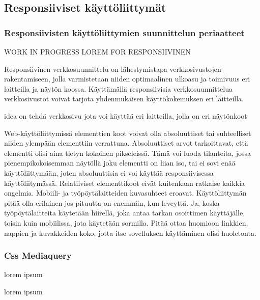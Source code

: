 \documentclass[11pt,a4paper,titlepage,oneside]{article}
\begin{document}
\newpage
\subsection{Responsiiviset käyttöliittymät}

\subsubsection{Responsiivisten käyttöliittymien suunnittelun periaatteet}

WORK IN PROGRESS LOREM FOR RESPONSIIVINEN
\medskip


Responsiivinen verkkosuunnittelu on lähestymistapa verkkosivustojen rakentamiseen, jolla varmistetaan niiden optimaalinen ulkoasu ja toimivuus eri laitteilla ja näytön koossa.
Käyttämällä responsiivisia verkkosuunnittelua verkkosivustot voivat tarjota yhdenmukaisen käyttökokemuksen eri laitteilla.

idea on tehdä verkkosivu jota voi käyttää eri laitteilla, jolla on eri näytönkoot
\medskip


Web-käyttöliittymissä elementtien koot voivat olla absoluuttiset tai suhteelliset niiden ylempään elementtiin verrattuna. Absoluuttiset arvot tarkoittavat, että elementti olisi aina tietyn kokoinen pikseleissä. 
Tämä voi luoda tilanteita, jossa pienempikokoisemman näytöllä joku elementti on liian iso, tai ei sovi enää käyttöliittymään, joten absoluuttisia ei voi käyttää responsiivisessa käyttöliitymässä.
Relatiiviset elementtikoot eivät kuitenkaan ratkaise kaikkia ongelmia. Mobiili- ja työpöytälaitteiden kuvasuhteet eroavat. Käyttöliittymän pitää olla erilainen jos pituutta on enemmän, kun leveyttä. 
Ja, koska työpöytälaitteita käytetään hiirellä, joka antaa tarkan osoittimen käyttäjälle, toisin kuin mobiilissa, jota käytetään sormilla. 
Pitää ottaa huomioon linkkien, nappien ja kuvakkeiden koko, jotta itse sovelluksen käyttäminen olisi huoletonta.\medskip
\medskip




\subsubsection{Css Mediaquery}

lorem ipsum

lorem ipsum
\end{document}
